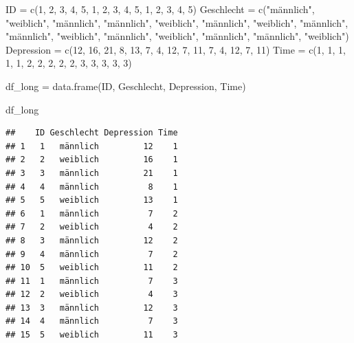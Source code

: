 \documentclass[
]{book}
\newenvironment{Shaded}{\begin{snugshade}}{\end{snugshade}}
\newcommand{\DecValTok}[1]{\textcolor[rgb]{0.00,0.00,0.81}{#1}}
\newcommand{\FunctionTok}[1]{\textcolor[rgb]{0.00,0.00,0.00}{#1}}
\newcommand{\NormalTok}[1]{#1}
\newcommand{\OtherTok}[1]{\textcolor[rgb]{0.56,0.35,0.01}{#1}}
\newcommand{\StringTok}[1]{\textcolor[rgb]{0.31,0.60,0.02}{#1}}
\begin{document}
\begin{Shaded}
\begin{Highlighting}[]
\NormalTok{ID }\OtherTok{=} \FunctionTok{c}\NormalTok{(}\DecValTok{1}\NormalTok{, }\DecValTok{2}\NormalTok{, }\DecValTok{3}\NormalTok{, }\DecValTok{4}\NormalTok{, }\DecValTok{5}\NormalTok{, }
       \DecValTok{1}\NormalTok{, }\DecValTok{2}\NormalTok{, }\DecValTok{3}\NormalTok{, }\DecValTok{4}\NormalTok{, }\DecValTok{5}\NormalTok{, }
       \DecValTok{1}\NormalTok{, }\DecValTok{2}\NormalTok{, }\DecValTok{3}\NormalTok{, }\DecValTok{4}\NormalTok{, }\DecValTok{5}\NormalTok{)}
\NormalTok{Geschlecht }\OtherTok{=} \FunctionTok{c}\NormalTok{(}\StringTok{"männlich"}\NormalTok{, }\StringTok{"weiblich"}\NormalTok{, }\StringTok{"männlich"}\NormalTok{, }\StringTok{"männlich"}\NormalTok{, }\StringTok{"weiblich"}\NormalTok{,}
               \StringTok{"männlich"}\NormalTok{, }\StringTok{"weiblich"}\NormalTok{, }\StringTok{"männlich"}\NormalTok{, }\StringTok{"männlich"}\NormalTok{, }\StringTok{"weiblich"}\NormalTok{,}
               \StringTok{"männlich"}\NormalTok{, }\StringTok{"weiblich"}\NormalTok{, }\StringTok{"männlich"}\NormalTok{, }\StringTok{"männlich"}\NormalTok{, }\StringTok{"weiblich"}\NormalTok{)}
\NormalTok{Depression }\OtherTok{=} \FunctionTok{c}\NormalTok{(}\DecValTok{12}\NormalTok{, }\DecValTok{16}\NormalTok{, }\DecValTok{21}\NormalTok{, }\DecValTok{8}\NormalTok{, }\DecValTok{13}\NormalTok{,}
               \DecValTok{7}\NormalTok{, }\DecValTok{4}\NormalTok{, }\DecValTok{12}\NormalTok{, }\DecValTok{7}\NormalTok{, }\DecValTok{11}\NormalTok{,}
               \DecValTok{7}\NormalTok{, }\DecValTok{4}\NormalTok{, }\DecValTok{12}\NormalTok{, }\DecValTok{7}\NormalTok{, }\DecValTok{11}\NormalTok{)}
\NormalTok{Time }\OtherTok{=} \FunctionTok{c}\NormalTok{(}\DecValTok{1}\NormalTok{, }\DecValTok{1}\NormalTok{, }\DecValTok{1}\NormalTok{, }\DecValTok{1}\NormalTok{, }\DecValTok{1}\NormalTok{,}
         \DecValTok{2}\NormalTok{, }\DecValTok{2}\NormalTok{, }\DecValTok{2}\NormalTok{, }\DecValTok{2}\NormalTok{, }\DecValTok{2}\NormalTok{,}
         \DecValTok{3}\NormalTok{, }\DecValTok{3}\NormalTok{, }\DecValTok{3}\NormalTok{, }\DecValTok{3}\NormalTok{, }\DecValTok{3}\NormalTok{)}

\NormalTok{df\_long }\OtherTok{=} \FunctionTok{data.frame}\NormalTok{(ID, Geschlecht, Depression, Time)}

\NormalTok{df\_long}
\end{Highlighting}
\end{Shaded}

\begin{verbatim}
##    ID Geschlecht Depression Time
## 1   1   männlich         12    1
## 2   2   weiblich         16    1
## 3   3   männlich         21    1
## 4   4   männlich          8    1
## 5   5   weiblich         13    1
## 6   1   männlich          7    2
## 7   2   weiblich          4    2
## 8   3   männlich         12    2
## 9   4   männlich          7    2
## 10  5   weiblich         11    2
## 11  1   männlich          7    3
## 12  2   weiblich          4    3
## 13  3   männlich         12    3
## 14  4   männlich          7    3
## 15  5   weiblich         11    3
\end{verbatim}
\end{document}
